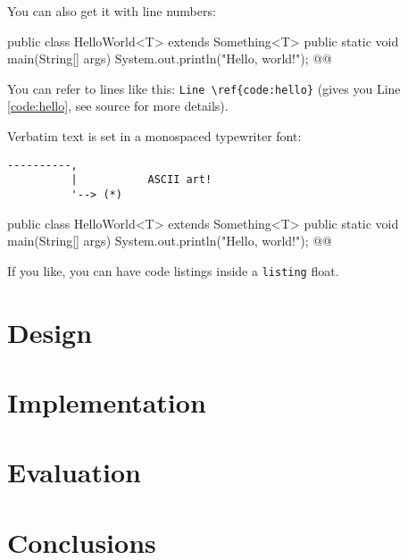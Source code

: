 \documentclass[11pt,titlepage,openright]{book}
\makeatletter
\renewenvironment{listing*}[1][]{%
  \begin{listing}[#1]%
    \checkoddpage%
    \ifoddpage%
      \begin{adjustwidth}{0cm}{-45mm}%
    \else%
      \begin{adjustwidth}{-45mm}{0cm}%
    \fi%
    }{%
    \end{adjustwidth}%
  \end{listing}}
\renewcommand{\c}[1]{\lstinline[style=std]@#1@}
\makeatother
\begin{document}
You can also get it with line numbers:

\begin{Code_Numbered}
public class HelloWorld<T> extends Something<T> {
  public static void main(String[] args) {
    System.out.println("Hello, world!"); @\label{code:hello}@
  }
}
\end{Code_Numbered}


You can refer to lines like this: \verb+Line \ref{code:hello}+ (gives you Line \ref{code:hello}, see source for more details).

Verbatim text is set in a monospaced typewriter font:

\begin{verbatim}
----------,
          |           ASCII art!
          '--> (*)
\end{verbatim}

\lipsum[2-4]

\begin{listing*}[t]
\begin{Code_Numbered}
public class HelloWorld<T> extends Something<T> {
  public static void main(String[] args) {
    System.out.println("Hello, world!"); @\label{code:hello}@
  }
}
\end{Code_Numbered}
\caption{If you like, you can have code listings inside a \c{listing} float.}
\end{listing*}



\chapter{Design}
\lipsum

\chapter{Implementation}
\lipsum

\chapter{Evaluation}
\lipsum

\chapter{Conclusions}
\lipsum



\end{document}
